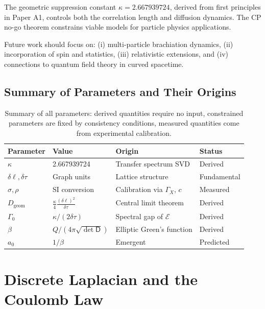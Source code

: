 \documentclass[11pt]{article}
\theoremstyle{plain}
\theoremstyle{definition}
\begin{document}
The geometric suppression constant $\kappa = 2.667939724$, derived from first principles in Paper A1, controls both the correlation length and diffusion dynamics. The CP no-go theorem constrains viable models for particle physics applications.

Future work should focus on: (i) multi-particle brachiation dynamics, (ii) incorporation of spin and statistics, (iii) relativistic extensions, and (iv) connections to quantum field theory in curved spacetime.

\subsection{Summary of Parameters and Their Origins}

\begin{table}[h]
  \centering
  \begin{tabular}{|l|l|l|l|}
    \hline
    \textbf{Parameter} & \textbf{Value} & \textbf{Origin} & \textbf{Status} \\
    \hline
    $\kappa$ & 2.667939724 & Transfer spectrum SVD & Derived \\
    $\delta\ell, \delta\tau$ & Graph units & Lattice structure & Fundamental \\
    $\sigma, \rho$ & SI conversion & Calibration via $\Gamma_X$, $c$ & Measured \\
    $D_{\mathrm{geom}}$ & $\frac{\kappa}{4}\frac{(\delta\ell)^2}{\delta\tau}$ & Central limit theorem & Derived \\
    $\Gamma_0$ & $\kappa/(2\delta\tau)$ & Spectral gap of $\mathcal{E}$ & Derived \\
    $\beta$ & $Q/(4\pi\sqrt{\det\mathsf{D}})$ & Elliptic Green's function & Derived \\
    $a_0$ & $1/\beta$ & Emergent & Predicted \\
    \hline
  \end{tabular}
  \caption{Summary of all parameters: derived quantities require no input, constrained parameters are fixed by consistency conditions, measured quantities come from experimental calibration.}
  \label{tab:parameters}
\end{table}

\appendix

\section{Discrete Laplacian and the Coulomb Law}
\label{app:discrete-laplacian-coulomb}
\end{document}

